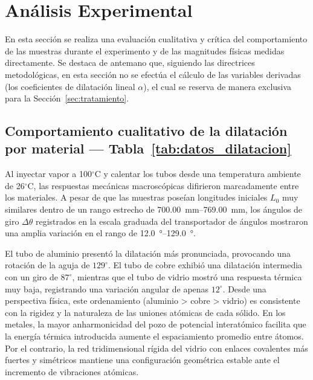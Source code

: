 
\section{Análisis Experimental}
\label{sec:analisis_exp}

En esta sección se realiza una evaluación cualitativa y crítica del comportamiento de las muestras durante el experimento y de las magnitudes físicas medidas directamente. Se destaca de antemano que, siguiendo las directrices metodológicas, en esta sección no se efectúa el cálculo de las variables derivadas (los coeficientes de dilatación lineal $\alpha$), el cual se reserva de manera exclusiva para la Sección~\ref{sec:tratamiento}.

\subsection{Comportamiento cualitativo de la dilatación por material --- Tabla~\ref{tab:datos_dilatacion}}

Al inyectar vapor a 100$^\circ$C y calentar los tubos desde una temperatura ambiente de 26$^\circ$C, las respuestas mecánicas macroscópicas difirieron marcadamente entre los materiales. A pesar de que las muestras poseían longitudes iniciales $L_0$ muy similares dentro de un rango estrecho de \qtyrange{700,00}{769,00}{\milli\meter}, los ángulos de giro $\Delta\theta$ registrados en la escala graduada del transportador de ángulos mostraron una amplia variación en el rango de \qtyrange{12,0}{129,0}{\degree}. 

El tubo de aluminio presentó la dilatación más pronunciada, provocando una rotación de la aguja de $129^\circ$. El tubo de cobre exhibió una dilatación intermedia con un giro de $87^\circ$, mientras que el tubo de vidrio mostró una respuesta térmica muy baja, registrando una variación angular de apenas $12^\circ$. Desde una perspectiva física, este ordenamiento (aluminio > cobre > vidrio) es consistente con la rigidez y la naturaleza de las uniones atómicas de cada sólido. En los metales, la mayor anharmonicidad del pozo de potencial interatómico facilita que la energía térmica introducida aumente el espaciamiento promedio entre átomos. Por el contrario, la red tridimensional rígida del vidrio con enlaces covalentes más fuertes y simétricos mantiene una configuración geométrica estable ante el incremento de vibraciones atómicas.

